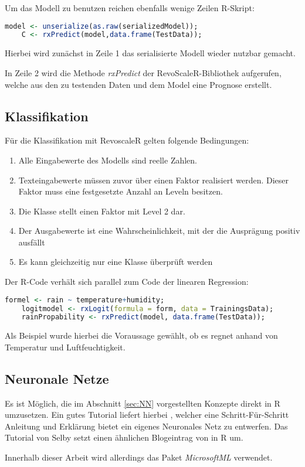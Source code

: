Um das Modell zu benutzen reichen ebenfalls wenige Zeilen R-Skript: \newline

\begin{lstlisting}[language=R]
	model <- unserialize(as.raw(serializedModel)); 
	C <- rxPredict(model,data.frame(TestData));
\end{lstlisting}

Hierbei wird zunächst in Zeile 1 das serialisierte Modell wieder nutzbar gemacht. 

In Zeile 2 wird die Methode \textit{rxPredict} der RevoScaleR-Bibliothek aufgerufen, welche aus den zu testenden Daten und dem Model eine Prognose erstellt. 
\subsection{Klassifikation}
Für die Klassifikation mit RevoscaleR gelten folgende Bedingungen: ~\newline

\begin{enumerate}
	\item Alle Eingabewerte des Modells sind reelle Zahlen.
	\item Texteingabewerte müssen zuvor über einen Faktor realisiert werden. Dieser Faktor muss eine festgesetzte Anzahl an Leveln besitzen.
	\item Die Klasse stellt einen Faktor mit Level 2 dar.
	\item Der Ausgabewerte ist eine Wahrscheinlichkeit, mit der die Ausprägung positiv ausfällt
	\item Es kann gleichzeitig nur eine Klasse überprüft werden
\end{enumerate}

Der R-Code verhält sich parallel zum Code der linearen Regression:

\begin{lstlisting}[language=R]
	formel <- rain ~ temperature+humidity;
	logitmodel <- rxLogit(formula = form, data = TrainingsData);
	rainPropability <- rxPredict(model, data.frame(TestData));
\end{lstlisting}

Als Beispiel wurde hierbei die Voraussage gewählt, ob es regnet anhand von Temperatur und Luftfeuchtigkeit.
\subsection{Neuronale Netze}
Es ist Möglich, die im Abschnitt \ref{sec:NN} vorgestellten Konzepte direkt in R umzusetzen. Ein gutes Tutorial liefert hierbei \cite{SelbyNN}, welcher eine Schritt-Für-Schritt Anleitung und Erklärung bietet ein eigenes Neuronales Netz zu entwerfen. Das Tutorial von Selby setzt einen ähnlichen Blogeintrag von \cite{DennyNN} in R um. 

Innerhalb dieser Arbeit wird allerdings das Paket \textit{MicrosoftML} verwendet.
